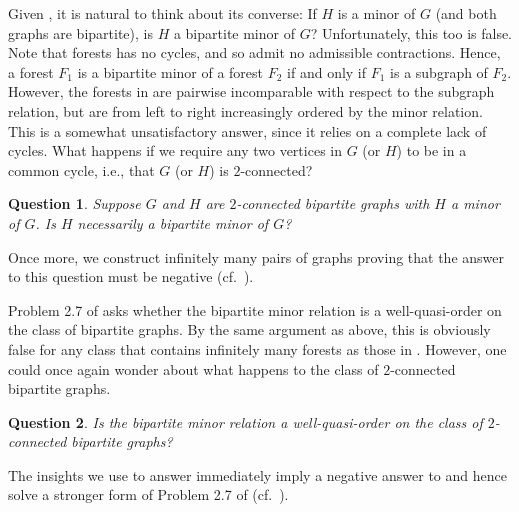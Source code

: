 \documentclass[a4paper,preprint,12pt]{elsarticle}
\newtheorem{question}{Question}
\begin{document}
Given , it is natural to think about its converse: If $H$ is a minor of $G$ (and both graphs are bipartite), is $H$ a bipartite minor of $G$?
Unfortunately, this too is false.
Note that forests has no cycles, and so admit no admissible contractions.
Hence, a forest $F_1$ is a bipartite minor of a forest $F_2$ if and only if $F_1$ is a subgraph of $F_2$.
However, the forests in  are pairwise incomparable with respect to the subgraph relation, but are from left to right increasingly ordered by the minor relation.
This is a somewhat unsatisfactory answer, since it relies on a complete lack of cycles.
What happens if we require any two vertices in $G$ (or $H$) to be in a common cycle, i.e., that $G$ (or $H$) is $2$-connected?
\begin{question}
    \label{question: minor implies bip minor}
    Suppose $G$ and $H$ are $2$-connected bipartite graphs with $H$ a minor of $G$.
    Is $H$ necessarily a bipartite minor of $G$?
\end{question}
Once more, we construct infinitely many pairs of graphs proving that the answer to this question must be negative (cf.~).

Problem 2.7 of \cite{bipartiteMinors} asks whether the bipartite  minor relation is a well-quasi-order on the class of bipartite graphs.
By the same argument as above, this is obviously false for any class that contains infinitely many forests as those in .
However, one could once again wonder about what happens to the class of $2$-connected bipartite graphs.
\begin{question}
    \label{question: wqo of bipartite minors}
    Is the bipartite minor relation a well-quasi-order on the class of $2$-connected bipartite graphs?
\end{question}
The insights we use to answer  immediately imply a negative answer to  and hence solve a stronger form of Problem 2.7 of \cite{bipartiteMinors} (cf.~).
\end{document}
